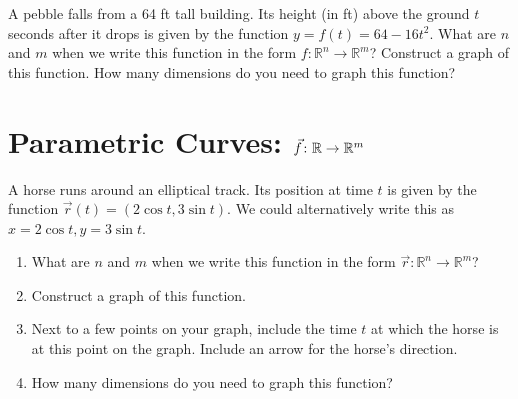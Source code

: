 
\begin{problem}\label{pebble problem}%
%
A pebble falls from a 64 ft tall building.  Its height (in ft) above the ground $t$ seconds after it drops is given by the function $y=f(t)=64-16t^2$. What are $n$ and $m$ when we write this function in the form  $f\colon {\mathbb{R}}^n\to {\mathbb{R}}^m$? Construct a graph of this function.  How many dimensions do you need to graph this function?
\end{problem}

\section{Parametric Curves: $\vec f\colon \mathbb{R} \to \mathbb{R}^m$}

\begin{problem}\label{parametric curve in plane example}%
%
%
A horse runs around an elliptical track. Its position at time $t$ is given by the  function $\vec r(t)=(2\cos t, 3\sin t).$ We could alternatively write this as $x=2\cos t, y=3\sin t$. 
 \begin{enumerate}
  \item What are $n$ and $m$ when we write this function in the form  $\vec r\colon {\mathbb{R}}^n\to {\mathbb{R}}^m$?
  \item Construct a graph of this function. 
  \item Next to a few points on your graph, include the time $t$ at which the horse is at this point on the graph. Include an arrow for the horse's direction.
  \item How many dimensions do you need to graph this function?
 \end{enumerate}
\end{problem}


